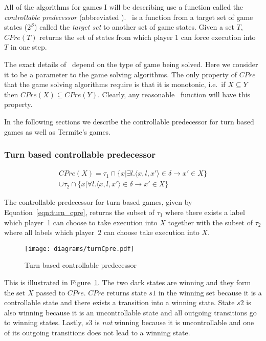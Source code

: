 All of the algorithms for games I will be describing use a function called the \emph{controllable predecessor} (abbreviated \cpre). \cpre\ is a function from a target set of game states ($2^S$) called the \emph{target set} to another set of game states. Given a set $T$, $CPre(T)$ returns the set of states from which player 1 can force execution into $T$ in one step. 

The exact details of \cpre\ depend on the type of game being solved. Here we consider it to be a parameter to the game solving algorithms. The only property of $CPre$ that the game solving algorithms require is that it is monotonic, i.e.\ if $X \subseteq Y$ then $CPre(X) \subseteq CPre(Y)$. Clearly, any reasonable \cpre\ function will have this property.

In the following sections we describe the controllable predecessor for turn based games as well as Termite's games.

\subsubsection{Turn based controllable predecessor}

\begin{multline}
CPre(X) = \tau_1 \cap \{x | \exists l. \langle x, l, x' \rangle \in \delta \rightarrow x' \in X\} \\ \cup \tau_2 \cap \{x | \forall l. \langle x, l, x' \rangle \in \delta \rightarrow x' \in X \}
\label{eqn:turn_cpre}
\end{multline}

The controllable predecessor for turn based games, given by Equation~\ref{eqn:turn_cpre}, returns the subset of $\tau_1$ where there exists a label which player~1 can choose to take execution into $X$ together with the subset of $\tau_2$ where all labels which player~2 can choose take execution into $X$. 

\begin{figure}[t]
\centering
\texttt{[image: diagrams/turnCpre.pdf]}
\caption{Turn based controllable predecessor}
\label{fig:turn_cpre}
\end{figure}

This is illustrated in Figure~\ref{fig:turn_cpre}. The two dark states are winning and they form the set $X$ passed to $CPre$. $CPre$ returns state $s1$ in the winning set because it is a controllable state and there exists a transition into a winning state. State $s2$ is also winning because it is an uncontrollable state and all outgoing transitions go to winning states. Lastly, $s3$ is \emph{not} winning because it is uncontrollable and one of its outgoing transitions does not lead to a winning state.

